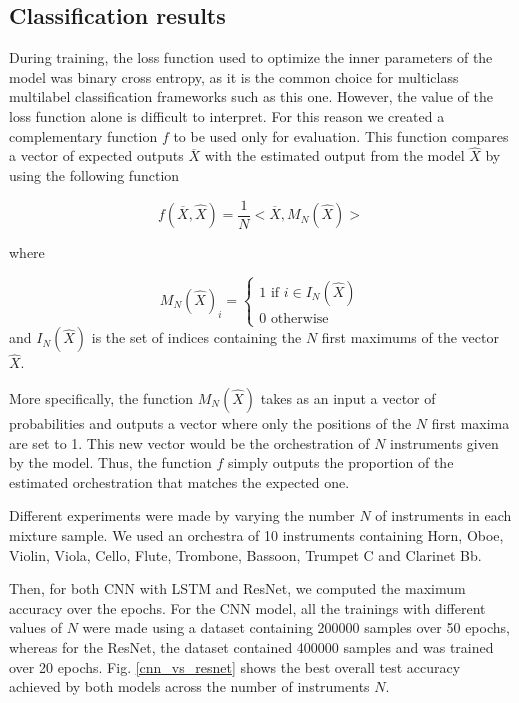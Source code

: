 \documentclass{article}
\begin{document}
\subsection{Classification results}

During training, the loss function used to optimize the inner parameters of the model was binary cross entropy, as it is the common choice for multiclass multilabel classification frameworks such as this one. However, the value of the loss function alone is difficult to interpret. For this reason we created a complementary function $f$ to be used only for evaluation. This function compares a vector of expected outputs $\overline{X}$ with the estimated output from the model $\hat{X}$ by using the following function

\begin{equation}
f(\overline{X}, \hat{X}) = \frac{1}{N}<\overline{X}, M_N(\hat{X})>
\label{eval}
\end{equation}

where

\begin{equation}
M_N(\hat{X})_i = \left\{\begin{array}{ll}
1 \text{ if } i \in I_N(\hat{X})\\
0 \text{ otherwise}
\end{array}\right.
\label{NMax}
\end{equation}
and $I_N(\hat{X})$ is the set of indices containing the $N$ first maximums of the vector $\hat{X}$.

More specifically, the function $M_N(\hat{X})$ takes as an input a vector of probabilities and outputs a vector where only the positions of the $N$ first maxima are set to 1. This new vector would be the orchestration of $N$ instruments given by the model. Thus, the function $f$ simply outputs the proportion of the estimated orchestration that matches the expected one.

Different experiments were made by varying the number $N$ of instruments in each mixture sample. We used an orchestra of 10 instruments containing Horn, Oboe, Violin, Viola, Cello, Flute, Trombone, Bassoon, Trumpet C and Clarinet Bb.

Then, for both CNN with LSTM and ResNet, we computed the maximum accuracy over the epochs. For the CNN model, all the trainings with different values of $N$ were made using a dataset containing 200000 samples over 50 epochs, whereas for the ResNet, the dataset contained 400000 samples and was trained over 20 epochs. Fig. \ref{cnn_vs_resnet} shows the best overall test accuracy achieved by both models across the number of instruments $N$.\\
\end{document}
